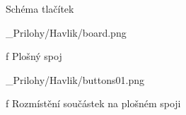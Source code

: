 \app Schéma tlačítek

\medskip {}
\picw=12cm _Prilohy/Havlik/board.png
\caption/f Plošný spoj
\medskip

\medskip
\medskip
\medskip

\medskip {}
\picw=12cm _Prilohy/Havlik/buttons01.png
\caption/f Rozmístění součástek na plošném spoji
\medskip

\par